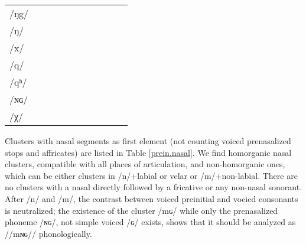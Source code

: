 \documentclass[oldfontcommands,oneside,a4paper,11pt]{article}
\newcommand{\ipa}[1]{/#1/} %
\begin{document}
\begin{table}
{\begin{tabular}{l|lll|lll|lll|l}
\ipa{ŋg} 	& 	  	& 	  	& 	  	& 	  	& 	  	& 	& 	  	& 	  	& 	 \\  
\ipa{ŋ}	& 	  	& 	  	& 	  	& 	  	& 	  	& 	& 	  	& 	  	& 	 \\  
\ipa{x}	& 	  	& 	  	& 	  	& 	  	& 	  	& 	& 	  	& 	  	& 	 \\  
\ipa{q} 	& 	  	& 	  	& 	  	& 	  	& 	  	& 	& 	  	& 	  	& 	 \\  
\ipa{qʰ} 	& 	  	& 	  	& 	  	& 	  	& 	  	& 	& 	  	& 	  	& 	 \\  
\ipa{ɴɢ} 	& 	  	& 	  	& 	  	& 	  	& 	  	& 	& 	  	& 	  	& 	 \\  
\ipa{χ} 	& 	  	& 	  	& 	  	& 	  	& 	  	& 	& 	  	& 	  	& 	 \\  
\bottomrule
\end{tabular}}
\end{table}

Clusters with nasal segments as first element (not counting voiced prenasalized stops and affricates) are listed in Table \ref{prein.nasal}. We find homorganic nasal clusters, compatible with all places of articulation, and non-homorganic ones, which can be either clusters in \ipa{n}+labial or velar or \ipa{m}+non-labial. There are no clusters with a nasal directly followed by a fricative or any non-nasal sonorant. After \ipa{n} and \ipa{m}, the contrast between voiced preinitial and vocied consonants is neutralized; the existence of the cluster \ipa{mɢ} while only the prenasalized phoneme \ipa{ɴɢ}, not simple voiced \ipa{ɢ} exists, shows that it should be analyzed as /\ipa{mɴɢ}/ phonologically.
\end{document}
